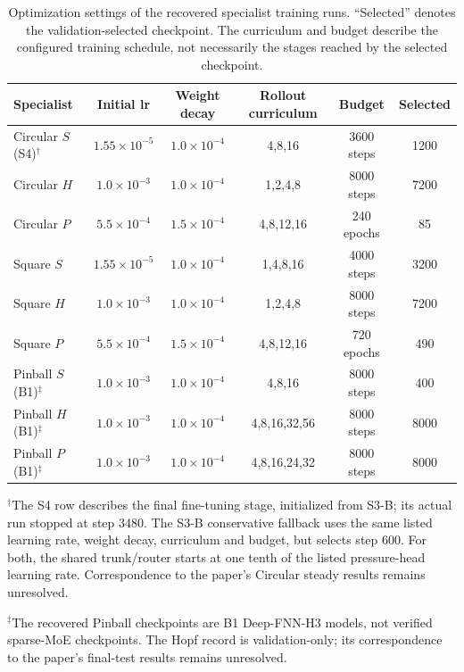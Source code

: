 \begin{table}[t]
\centering
\caption{Optimization settings of the recovered specialist training runs.
``Selected'' denotes the validation-selected checkpoint.
The curriculum and budget describe the configured training schedule,
not necessarily the stages reached by the selected checkpoint.}
\label{tab:specialist_training}
\small
\setlength{\tabcolsep}{3.5pt}
\begin{tabular}{@{}lccccc@{}}
\toprule
Specialist & Initial lr & Weight decay & Rollout curriculum & Budget & Selected \\
\midrule
Circular $S$ (S4)$^{\dagger}$
& $1.55{\times}10^{-5}$ & $1.0{\times}10^{-4}$ & 4,8,16 & 3600 steps & 1200 \\
Circular $H$
& $1.0{\times}10^{-3}$ & $1.0{\times}10^{-4}$ & 1,2,4,8 & 8000 steps & 7200 \\
Circular $P$
& $5.5{\times}10^{-4}$ & $1.5{\times}10^{-4}$ & 4,8,12,16 & 240 epochs & 85 \\
\midrule
Square $S$
& $1.55{\times}10^{-5}$ & $1.0{\times}10^{-4}$ & 1,4,8,16 & 4000 steps & 3200 \\
Square $H$
& $1.0{\times}10^{-3}$ & $1.0{\times}10^{-4}$ & 1,2,4,8 & 8000 steps & 7200 \\
Square $P$
& $5.5{\times}10^{-4}$ & $1.5{\times}10^{-4}$ & 4,8,12,16 & 720 epochs & 490 \\
\midrule
Pinball $S$ (B1)$^{\ddagger}$
& $1.0{\times}10^{-3}$ & $1.0{\times}10^{-4}$ & 4,8,16 & 8000 steps & 400 \\
Pinball $H$ (B1)$^{\ddagger}$
& $1.0{\times}10^{-3}$ & $1.0{\times}10^{-4}$ & 4,8,16,32,56 & 8000 steps & 8000 \\
Pinball $P$ (B1)$^{\ddagger}$
& $1.0{\times}10^{-3}$ & $1.0{\times}10^{-4}$ & 4,8,16,24,32 & 8000 steps & 8000 \\
\bottomrule
\end{tabular}
\par\smallskip
\begin{minipage}{\linewidth}
\footnotesize
$^{\dagger}$The S4 row describes the final fine-tuning stage, initialized from
S3-B; its actual run stopped at step 3480. The S3-B conservative fallback
uses the same listed learning rate, weight decay, curriculum and budget,
but selects step 600. For both, the shared trunk/router starts at one tenth
of the listed pressure-head learning rate. Correspondence to the paper's
Circular steady results remains unresolved.
\par
$^{\ddagger}$The recovered Pinball checkpoints are B1 Deep-FNN-H3 models,
not verified sparse-MoE checkpoints. The Hopf record is validation-only;
its correspondence to the paper's final-test results remains unresolved.
\end{minipage}
\end{table}
